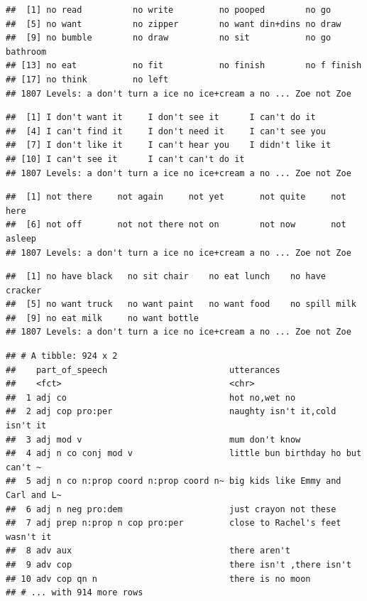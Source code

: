 \documentclass[man]{apa6}
\begin{document}
\begin{verbatim}
##  [1] no read          no write         no pooped        no go           
##  [5] no want          no zipper        no want din+dins no draw         
##  [9] no bumble        no draw          no sit           no go bathroom  
## [13] no eat           no fit           no finish        no f finish     
## [17] no think         no left         
## 1807 Levels: a don't turn a ice no ice+cream a no ... Zoe not Zoe
\end{verbatim}

\begin{verbatim}
##  [1] I don't want it     I don't see it      I can't do it      
##  [4] I can't find it     I don't need it     I can't see you    
##  [7] I don't like it     I can't hear you    I didn't like it   
## [10] I can't see it      I can't can't do it
## 1807 Levels: a don't turn a ice no ice+cream a no ... Zoe not Zoe
\end{verbatim}

\begin{verbatim}
##  [1] not there     not again     not yet       not quite     not here     
##  [6] not off       not not there not on        not now       not asleep   
## 1807 Levels: a don't turn a ice no ice+cream a no ... Zoe not Zoe
\end{verbatim}

\begin{verbatim}
##  [1] no have black   no sit chair    no eat lunch    no have cracker
##  [5] no want truck   no want paint   no want food    no spill milk  
##  [9] no eat milk     no want bottle 
## 1807 Levels: a don't turn a ice no ice+cream a no ... Zoe not Zoe
\end{verbatim}

\begin{verbatim}
## # A tibble: 924 x 2
##    part_of_speech                        utterances                        
##    <fct>                                 <chr>                             
##  1 adj co                                hot no,wet no                     
##  2 adj cop pro:per                       naughty isn't it,cold isn't it    
##  3 adj mod v                             mum don't know                    
##  4 adj n co conj mod v                   little bun birthday ho but can't ~
##  5 adj n co n:prop coord n:prop coord n~ big kids like Emmy and Carl and L~
##  6 adj n neg pro:dem                     just crayon not these             
##  7 adj prep n:prop n cop pro:per         close to Rachel's feet wasn't it  
##  8 adv aux                               there aren't                      
##  9 adv cop                               there isn't ,there isn't          
## 10 adv cop qn n                          there is no moon                  
## # ... with 914 more rows
\end{verbatim}
\end{document}
